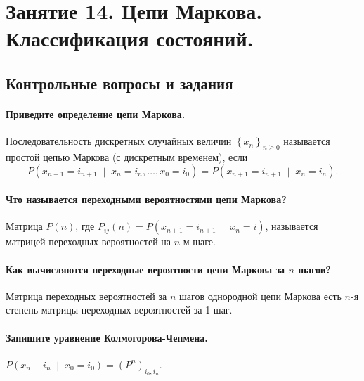 \chapter*{Занятие 14. Цепи Маркова. Классификация состояний.}

\section*{Контрольные вопросы и задания}

\subsubsection*{Приведите определение цепи Маркова.}

Последовательность дискретных случайных величин $ \left\{ x_n \right\}_{n \geq 0}$
называется простой цепью Маркова (с дискретным временем), если
\begin{equation*}
  P \left( x_{n + 1} = i_{n + 1} \; \middle| \; x_n = i_n, \dotsc, x_0 = i_0 \right) =
  P \left( x_{n + 1} = i_{n + 1} \; \middle| \; x_n = i_n \right).
\end{equation*}

\subsubsection*{Что называется переходными вероятностями цепи Маркова?}

Матрица $P \left( n \right) $,
где $P_{ij} \left( n \right) = P \left( x_{n + 1} = i_{n + 1} \; \middle| \; x_n = i \right) $,
называется матрицей переходных вероятностей на $n$-м шаге.

\subsubsection*{Как вычисляются переходные вероятности цепи Маркова за $n$ шагов?}

Матрица переходных вероятностей за $n$ шагов однородной цепи Маркова есть $n$-я
степень матрицы переходных вероятностей за 1 шаг.

\subsubsection*{Запишите уравнение Колмогорова-Чепмена.}

$P \left( x_n - i_n \; \middle| \; x_0 = i_0 \right) =
  \left( P^n \right)_{i_0, i_n}$.

